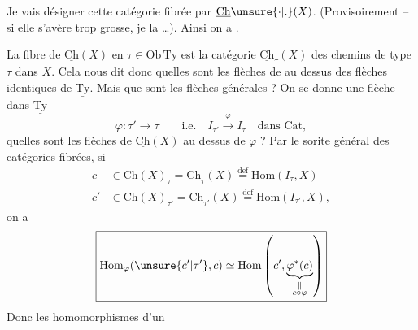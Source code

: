 
Je vais  désigner cette catégorie fibrée par $\underline{\mathrm{Ch}}\unsure{\cdot|.}(X)$. (Provisoirement -- si elle s'avère trop grosse, je la \ldots). Ainsi on a
.

La fibre de $\underline{\mathrm{Ch}}(X)$ en $\tau\in\mathrm{Ob}\,\underline{\mathrm{Ty}}$ est la catégorie $\underline{\mathrm{Ch}}_\tau(X)$ des chemins de type $\tau$ dans $X$.  Cela nous dit donc quelles sont les flèches de  au dessus des flèches identiques de $\underline{\mathrm{Ty}}$. Mais que sont les flèches  générales ? On se donne une flèche dans $\underline{\mathrm{Ty}}$
\[ \varphi\colon\tau'\longrightarrow\tau\qquad\text{i.e.}\quad I_{\tau'}\xrightarrow{\varphi}I_\tau\quad\text{dans }\mathrm{Cat}, \]
quelles sont les flèches de $\underline{\mathrm{Ch}}(X)$ au dessus de $\varphi$ ? Par le sorite général des catégories fibrées, si
\[ \begin{aligned}
c&\in\underline{\mathrm{Ch}}(X)_\tau=\underline{\mathrm{Ch}}_\tau(X)\overset{\mathrm{def}}{=}\underline{\mathrm{Hom}}(I_\tau,X)\\
c'&\in\underline{\mathrm{Ch}}(X)_{\tau'}=\underline{\mathrm{Ch}}_{\tau'}(X)\overset{\mathrm{def}}{=}\underline{\mathrm{Hom}}(I_{\tau'},X),
\end{aligned} \]
on a
\[ \boxed{\mathrm{Hom}_\varphi(\unsure{c'|\tau'},c)\simeq\mathrm{Hom}\left(c',\underbrace{\varphi^*(c)}_{\substack{\Vert\\c\circ\varphi}}\right)} \]
Donc \unsure{!|:} les  homomorphismes d'un
